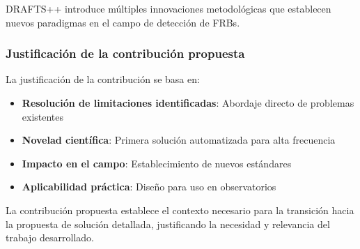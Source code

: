 DRAFTS++ introduce múltiples innovaciones metodológicas que establecen nuevos paradigmas en el campo de detección de FRBs.

\subsubsection{Justificación de la contribución propuesta}

La justificación de la contribución se basa en:

\begin{itemize}
    \item \textbf{Resolución de limitaciones identificadas}: Abordaje directo de problemas existentes
    \item \textbf{Novelad científica}: Primera solución automatizada para alta frecuencia
    \item \textbf{Impacto en el campo}: Establecimiento de nuevos estándares
    \item \textbf{Aplicabilidad práctica}: Diseño para uso en observatorios
\end{itemize}

La contribución propuesta establece el contexto necesario para la transición hacia la propuesta de solución detallada, justificando la necesidad y relevancia del trabajo desarrollado.
